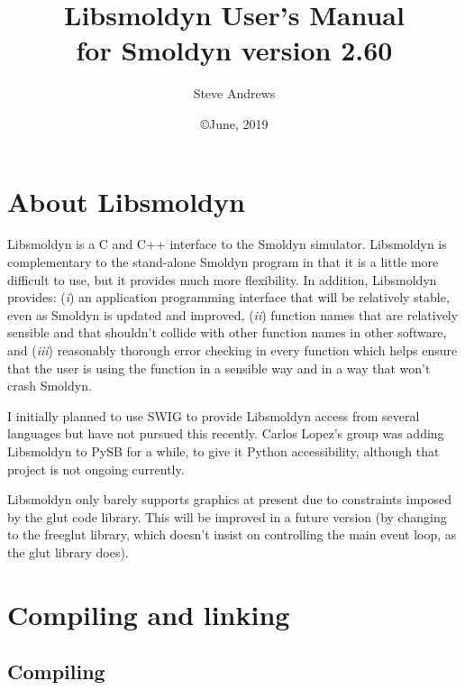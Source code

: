 \documentclass {book}
\begin{document}



\title{\textbf{Libsmoldyn User's Manual} \\ \large for Smoldyn version 2.60}
\date{\copyright June, 2019}
\author{Steve Andrews}
\maketitle

\tableofcontents


\chapter{About Libsmoldyn}
Libsmoldyn is a C and C++ interface to the Smoldyn simulator.  Libsmoldyn is complementary to the stand-alone Smoldyn program in that it is a little more difficult to use, but it provides much more flexibility.  In addition, Libsmoldyn provides: (\emph{i}) an application programming interface that will be relatively stable, even as Smoldyn is updated and improved, (\emph{ii}) function names that are relatively sensible and that shouldn't collide with other function names in other software, and (\emph{iii}) reasonably thorough error checking in every function which helps ensure that the user is using the function in a sensible way and in a way that won't crash Smoldyn.

I initially planned to use SWIG to provide Libsmoldyn access from several languages but have not pursued this recently.  Carlos Lopez's group was adding Libsmoldyn to PySB for a while, to give it Python accessibility, although that project is not ongoing currently.

Libsmoldyn only barely supports graphics at present due to constraints imposed by the glut code library.  This will be improved in a future version (by changing to the freeglut library, which doesn't insist on controlling the main event loop, as the glut library does).


\chapter{Compiling and linking}

\section{Compiling}
\end{document}
